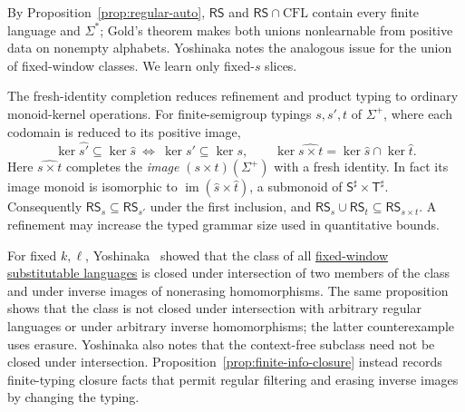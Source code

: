 \documentclass[11pt,a4paper]{article}
\theoremstyle{remark}
\theoremstyle{plain}
\begin{document}
By Proposition~\ref{prop:regular-auto}, $\mathsf{RS}$ and
$\mathsf{RS}\cap\mathrm{CFL}$ contain every finite language and
$\Sigma^*$; Gold's theorem makes both unions nonlearnable from
positive data on nonempty alphabets.  Yoshinaka
\cite[Section~4]{yoshinaka2008} notes the analogous issue for
the union of fixed-window classes.  We learn only fixed-$s$ slices.

The fresh-identity completion reduces refinement and
product typing to ordinary monoid-kernel operations.
For finite-semigroup typings $s,s',t$ of $\Sigma^+$,
where each codomain is reduced to its positive image,
\[
\ker\widehat{s'}\subseteq\ker\widehat s
\ \Longleftrightarrow\
\ker s'\subseteq\ker s,\qquad
\ker\widehat{s\times t}
=\ker\widehat s\cap\ker\widehat t.
\]
Here $\widehat{s\times t}$ completes the \emph{image}
$(s\times t)(\Sigma^+)$ with a fresh identity.
In fact its image monoid is isomorphic to
$\operatorname{im}(\widehat s\times\widehat t)$,
a submonoid of $\mathsf S^\sharp\times\mathsf T^\sharp$.
Consequently $\mathsf{RS}_s\subseteq\mathsf{RS}_{s'}$
under the first inclusion, and
$\mathsf{RS}_s\cup\mathsf{RS}_t
\subseteq\mathsf{RS}_{s\times t}$.
A refinement may increase the typed grammar size
used in quantitative bounds.

For fixed $k,\ell$, Yoshinaka~\cite[Proposition~1]{yoshinaka2008}
showed that the class of all
\hyperlink{def:kl-subst}{fixed-window}
\hyperlink{def:kl-subst}{substitutable languages}
is closed under intersection of two members of the class and under
inverse images of nonerasing homomorphisms.
The same proposition shows that the class is not closed under
intersection with arbitrary regular languages or under arbitrary
inverse homomorphisms; the latter counterexample uses erasure.
Yoshinaka also notes that the context-free subclass need not be
closed under intersection.
Proposition~\ref{prop:finite-info-closure} instead records
finite-typing closure facts that permit regular filtering and
erasing inverse images by changing the typing.
\end{document}
